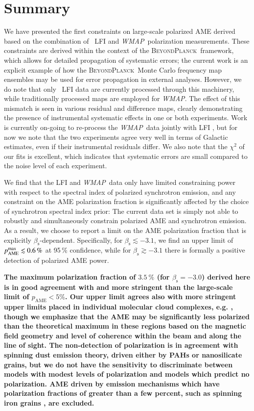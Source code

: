 \documentclass[twocolumn]{aa}
\def\WMAP{\textit{WMAP}}
\newcommand{\BP}{\textsc{BeyondPlanck}}
\begin{document}
\section{Summary}
\label{sec:summary}


We have presented the first constraints on large-scale polarized AME
derived based on the combination of \Planck\ LFI and
\WMAP\ polarization measurements. These constraints are derived within
the context of the \BP\ framework, which allows for detailed
propagation of systematic errors; the current work is an explicit
example of how the \BP\ Monte Carlo frequency map ensembles may be
used for error propagation in external analyses. However, we do note
that only \Planck\ LFI data are currently processed through this
machinery, while traditionally processed maps are employed for
\WMAP. The effect of this mismatch is seen in various residual and
difference maps, clearly demonstrating the presence of instrumental
systematic effects in one or both experiments. Work is currently
on-going to re-process the \WMAP\ data jointly with LFI \citep{bp17},
but for now we note that the two experiments agree very well in terms
of Galactic estimates, even if their instrumental residuals
differ. We also note that the $\chi^2$ of our fits is
excellent, which indicates that systematic errors are small compared
to the noise level of each experiment. 

We find that the LFI and \WMAP\ data only have limited
constraining power with respect to the spectral index of polarized
synchrotron emission, and any constraint on the AME polarization
fraction is significantly affected by the choice of synchrotron
spectral index prior: The current data set is simply not able to
robustly and simultaneously constrain polarized AME and synchrotron
emission. As a result, we choose to report a limit on the AME
polarization fraction that is explicitly
$\beta_{\mathrm{s}}$-dependent. Specifically, for
$\beta_{\mathrm{s}}\lesssim -3.1$, we find an upper limit of
$p_{\mathrm{AME}}^{\rm max}\lesssim0.6\,\%$ at 95\,\% confidence,
while for $\beta_{\mathrm{s}}\gtrsim -3.1$ there is formally a positive
detection of polarized AME power. 

\textbf{The maximum polarization fraction of $3.5~\%$ (for $\beta_{\mathrm{s}} = -3.0$) derived here is in good agreement with and more stringent than the large-scale \cite{Macellari_2011} limit of $p_{\mathrm{AME}}<5\%$. Our upper limit agrees also with more stringent upper limits placed in individual molecular cloud complexes, e.g. \citep{battistelli2006,QUIJOTE_II_2016,QUIJOTE_III}, though we emphasize that the AME may be significantly less polarized than the theoretical maximum in these regions based on the magnetic field geometry and level of coherence within the beam and along the line of sight. The non-detection of polarization is in agreement with spinning dust emission theory, driven either by PAHs or nanosilicate grains, but we do not have the sensitivity to discriminate between models with modest levels of polarization and models which predict no polarization. AME driven by emission mechanisms which have polarization fractions of greater than a few percent, such as spinning iron grains \citep{Hoang_2016}, are excluded.}
\end{document}
